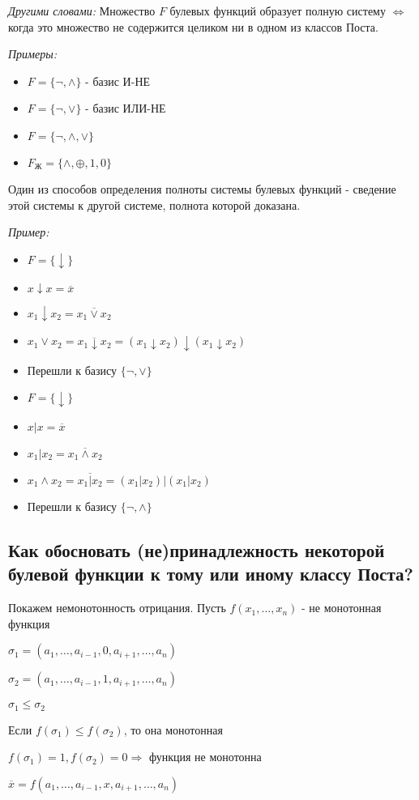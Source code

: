 \documentclass[10pt]{article}
\begin{document}
\par\textit{Другими словами:}  Множество $F$ булевых функций образует полную систему $\Leftrightarrow$ когда это множество не содержится целиком ни в одном из классов Поста.
\par\textit{Примеры:}
\begin{itemize}
    \item $F = \{ \neg, \land \}$ - базис И-НЕ
    \item $F = \{ \neg, \lor \}$ - базис ИЛИ-НЕ
    \item $F = \{ \neg, \land, \lor \}$
    \item $F_\text{Ж} = \{ \land, \oplus, 1, 0 \}$
\end{itemize}

\par Один из способов определения полноты системы булевых функций - сведение этой системы к другой системе, полнота которой доказана.
\par\textit{Пример:}
\begin{itemize}
\item $F = \{ \downarrow \}$
\item[] $x \downarrow x = \overline x$
\item[] $x_1 \downarrow x_2 = \overline{x_1 \lor x_2}$
\item[] $x_1 \lor x_2 = \overline{x_1 \downarrow x_2} = (x_1 \downarrow x_2) \downarrow (x_1 \downarrow x_2)$
\item[] Перешли к базису $\{ \neg, \lor \}$
\item $F = \{ \downarrow \}$
\item[] $x \vert x = \overline x$
\item[] $x_1 \vert x_2 = \overline{x_1 \land x_2}$
\item[] $x_1 \land x_2 = \overline{x_1 \vert x_2} = (x_1 \vert x_2) \vert (x_1 \vert x_2)$
\item[] Перешли к базису $\{ \neg, \land \}$
\end{itemize}
\subsection*{Как обосновать (не)принадлежность некоторой булевой функции к тому или иному классу Поста?}
\par Покажем немонотонность отрицания. Пусть $f(x_1, \dots, x_n)$ - не монотонная функция
\par $\sigma_1 = (a_1, \dots, a_{i-1}, 0, a_{i+1}, \dots, a_n)$
\par $\sigma_2 = (a_1, \dots, a_{i-1}, 1, a_{i+1}, \dots, a_n)$
\par $\sigma_1 \le \sigma_2$
\par Если $f(\sigma_1) \le f(\sigma_2)$, то она монотонная
\par $f(\sigma_1) = 1, f(\sigma_2) = 0 \Rightarrow$ функция не монотонна
\par $\overline x = f(a_1, \dots, a_{i-1}, x, a_{i+1}, \dots, a_n)$
\end{document}
